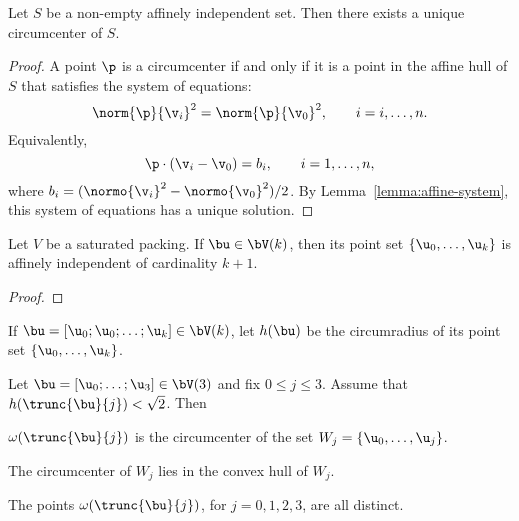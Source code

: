 \begin{lemma} 
Let $S$ be a non-empty affinely independent set.  Then there exists a unique
circumcenter of $S$.
\end{lemma}

\begin{proof}
A point $\p$ is a circumcenter if and only if it is a point in the affine hull of $S$
that satisfies the system of equations:
\begin{displaymath}
\norm{\p}{\v_i}^2 = \norm{\p}{\v_0}^2,\qquad i = i,\ldots,n.
\end{displaymath}
Equivalently,
\begin{displaymath}
\p\cdot (\v_i-\v_0) = b_i,\qquad i=1,\ldots,n,
\end{displaymath}
where $b_i = (\normo{\v_i}^2-\normo{\v_0}^2)/2$.  By
Lemma~\ref{lemma:affine-system}, this system of equations has a unique
solution.
\end{proof}

\begin{lemma}
Let $V$ be a saturated packing.
If $\bu\in \bV(k)$, then its point set $\{\u_0,\ldots,\u_k\}$ 
is affinely independent of cardinality $k+1$.
\end{lemma}

\begin{proof}
\end{proof}


\begin{definition}[h]
If $\bu=[\u_0;\u_0;\ldots;\u_k]\in \bV(k)$, let $h(\bu)$ be the
circumradius of its point set $\{ \u_0,\ldots, \u_k\}$.
\end{definition}
%

\begin{lemma}\label{lemma:v2} 
Let $\bu=[\u_0;\ldots;\u_3]\in \bV(3)$ and fix $0\le j\le 3$.
Assume that $h(\trunc{\bu}{j})<\sqrt2$.
Then 
\begin{nomerate}
\item {} $\omega(\trunc{\bu}{j})$ is the circumcenter of the
set $W_j =\{ \u_0,\ldots, \u_j\}$.
\item {} The circumcenter of $W_j$ lies in the convex
hull of $W_j$.
\item {} The points $\omega(\trunc{\bu}{j})$, for
$j=0,1,2,3$, are all distinct.
\end{nomerate}
\end{lemma}
%

